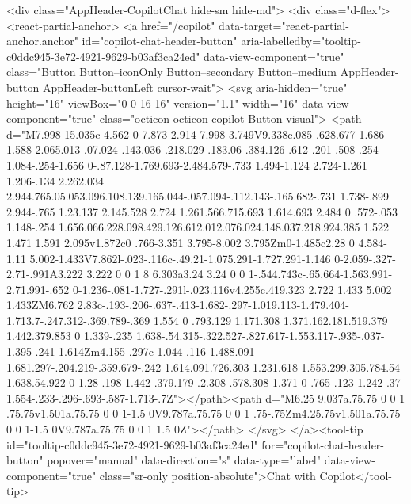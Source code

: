         
          <div class="AppHeader-CopilotChat hide-sm hide-md">
  <div class="d-flex">
    <react-partial-anchor>
        <a href="/copilot" data-target="react-partial-anchor.anchor" id="copilot-chat-header-button" aria-labelledby="tooltip-c0ddc945-3e72-4921-9629-b03af3ca24ed" data-view-component="true" class="Button Button--iconOnly Button--secondary Button--medium AppHeader-button AppHeader-buttonLeft cursor-wait">  <svg aria-hidden="true" height="16" viewBox="0 0 16 16" version="1.1" width="16" data-view-component="true" class="octicon octicon-copilot Button-visual">
    <path d="M7.998 15.035c-4.562 0-7.873-2.914-7.998-3.749V9.338c.085-.628.677-1.686 1.588-2.065.013-.07.024-.143.036-.218.029-.183.06-.384.126-.612-.201-.508-.254-1.084-.254-1.656 0-.87.128-1.769.693-2.484.579-.733 1.494-1.124 2.724-1.261 1.206-.134 2.262.034 2.944.765.05.053.096.108.139.165.044-.057.094-.112.143-.165.682-.731 1.738-.899 2.944-.765 1.23.137 2.145.528 2.724 1.261.566.715.693 1.614.693 2.484 0 .572-.053 1.148-.254 1.656.066.228.098.429.126.612.012.076.024.148.037.218.924.385 1.522 1.471 1.591 2.095v1.872c0 .766-3.351 3.795-8.002 3.795Zm0-1.485c2.28 0 4.584-1.11 5.002-1.433V7.862l-.023-.116c-.49.21-1.075.291-1.727.291-1.146 0-2.059-.327-2.71-.991A3.222 3.222 0 0 1 8 6.303a3.24 3.24 0 0 1-.544.743c-.65.664-1.563.991-2.71.991-.652 0-1.236-.081-1.727-.291l-.023.116v4.255c.419.323 2.722 1.433 5.002 1.433ZM6.762 2.83c-.193-.206-.637-.413-1.682-.297-1.019.113-1.479.404-1.713.7-.247.312-.369.789-.369 1.554 0 .793.129 1.171.308 1.371.162.181.519.379 1.442.379.853 0 1.339-.235 1.638-.54.315-.322.527-.827.617-1.553.117-.935-.037-1.395-.241-1.614Zm4.155-.297c-1.044-.116-1.488.091-1.681.297-.204.219-.359.679-.242 1.614.091.726.303 1.231.618 1.553.299.305.784.54 1.638.54.922 0 1.28-.198 1.442-.379.179-.2.308-.578.308-1.371 0-.765-.123-1.242-.37-1.554-.233-.296-.693-.587-1.713-.7Z"></path><path d="M6.25 9.037a.75.75 0 0 1 .75.75v1.501a.75.75 0 0 1-1.5 0V9.787a.75.75 0 0 1 .75-.75Zm4.25.75v1.501a.75.75 0 0 1-1.5 0V9.787a.75.75 0 0 1 1.5 0Z"></path>
</svg>
</a><tool-tip id="tooltip-c0ddc945-3e72-4921-9629-b03af3ca24ed" for="copilot-chat-header-button" popover="manual" data-direction="s" data-type="label" data-view-component="true" class="sr-only position-absolute">Chat with Copilot</tool-tip>

